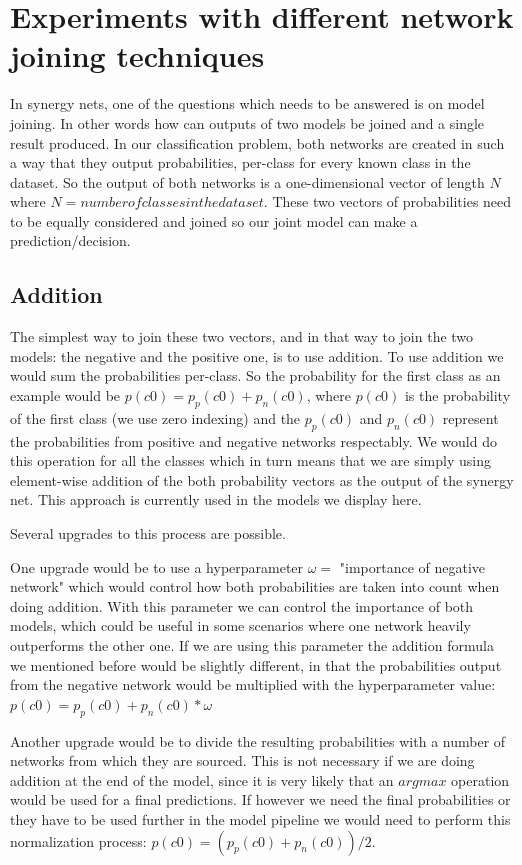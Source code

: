 \documentclass[b5paper]{book}
\begin{document}
\section{Experiments with different network joining techniques}

In synergy nets, one of the questions which needs to be answered is on model joining. In other words how can outputs of two models be joined and a single result produced. In our classification problem, both networks are created in such a way that they output probabilities, per-class for every known class in the dataset. So the output of both networks is a one-dimensional vector of length \( N \) where \( N = number of classes in the dataset \). These two vectors of probabilities need to be equally considered and joined so our joint model can make a prediction/decision.

\subsection{Addition}

The simplest way to join these two vectors, and in that way to join the two models: the negative and the positive one, is to use addition. To use addition we would sum the probabilities per-class. So the probability for the first class as an example would be \( p(c0) = p_p(c0) + p_n(c0) \), where \( p(c0) \) is the probability of the first class (we use zero indexing) and the \(p_p(c0)\) and \(p_n(c0)\) represent the probabilities from positive and negative networks respectably. We would do this operation for all the classes which in turn means that we are simply using element-wise addition of the both probability vectors as the output of the synergy net. This approach is currently used in the models we display here.

Several upgrades to this process are possible.

One upgrade would be to use a hyperparameter \( \omega = \) "importance of negative network"  which would control how both probabilities are taken into count when doing addition. With this parameter we can control the importance of both models, which could be useful in some scenarios where one network heavily outperforms the other one. If we are using this parameter the addition formula we mentioned before would be slightly different, in that the probabilities output from the negative network would be multiplied with the hyperparameter value: \( p(c0) = p_p(c0) + p_n(c0) * \omega \)

Another upgrade would be to divide the resulting probabilities with a number of networks from which they are sourced. This is not necessary if we are doing addition at the end of the model, since it is very likely that an \( argmax \) operation would be used for a final predictions. If however we need the final probabilities or they have to be used further in the model pipeline we would need to perform this normalization process: \( p(c0) = (p_p(c0) + p_n(c0)) / 2 \).
\end{document}
